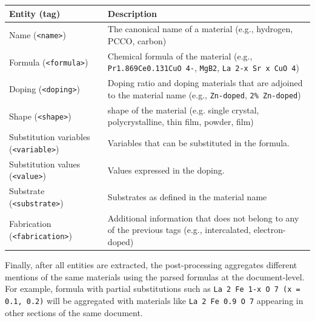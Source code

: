 \documentclass[]{interact}
\theoremstyle{plain}%
\theoremstyle{definition}
\theoremstyle{remark}
\begin{document}
\begin{table}[ht]
    {
        \begin{tabular}{m{16em} m{30em}}
            \toprule
            \textbf{Entity} (\textbf{tag})               & \textbf{Description}                                                                                                              \\
            \midrule
            Name (\texttt{<name>})                       & The canonical name of a material (e.g., hydrogen, PCCO, carbon)                                                                    \\
            Formula (\texttt{<formula>})                 & Chemical formula of the material (e.g., \texttt{Pr1.869Ce0.131CuO 4-}, \texttt{MgB2}, \texttt{La 2-x Sr x CuO 4})                  \\
            Doping (\texttt{<doping>})                   & Doping ratio and doping materials that are adjoined to the material name (e.g., \texttt{Zn-doped}, \texttt{2\% Zn-doped})          \\
            Shape (\texttt{<shape>})                     & shape of the material (e.g. single crystal, polycrystalline, thin film, powder, film)                                             \\
            Substitution variables (\texttt{<variable>}) & Variables that can be substituted in the formula.                                                                                 \\
            Substitution values (\texttt{<value>})       & Values expressed in the doping.                                                                                                   \\
            Substrate (\texttt{<substrate>})             & Substrates as defined in the material name                                                                                        \\
            Fabrication (\texttt{<fabrication>})         & Additional information that does not belong to any of the previous tags  (e.g., intercalated, electron-doped) \\
            \bottomrule
        \end{tabular}
    }
    \label{tab:material-parser-entities}
\end{table}

Finally, after all entities are extracted, the post-processing aggregates different mentions of the same materials using the parsed formulas at the document-level.
For example, formula with partial substitutions such as \texttt{La 2 Fe 1-x O 7 (x = 0.1, 0.2)} will be aggregated with materials like \texttt{La 2 Fe 0.9 O 7} appearing in other sections of the same document.
\end{document}
